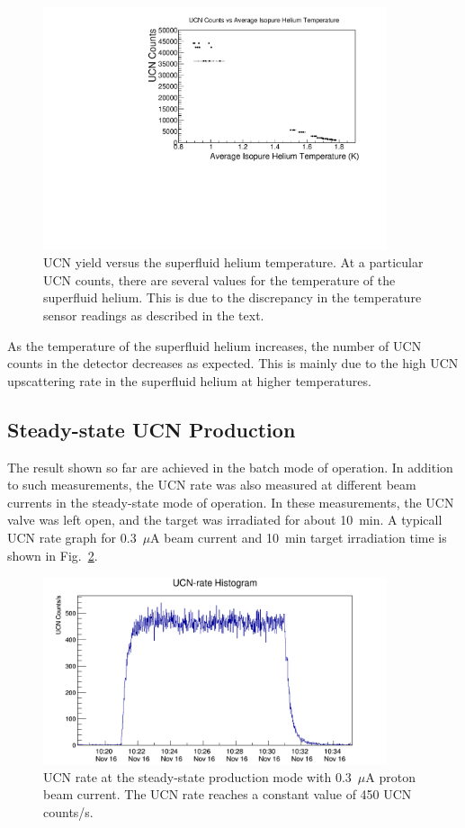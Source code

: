 \begin{figure}[h!]
  \centering
  \includegraphics[width=0.9\textwidth]{counts_vs_temp.pdf}
  \caption{UCN yield versus the superfluid helium temperature. At a
    particular UCN counts, there are several values for the
    temperature of the superfluid helium. This is due to the
    discrepancy in the temperature sensor readings as described in the
    text.}
  \label{fig:counts_vs_temp}
\end{figure}

As the temperature of the superfluid helium increases, the
number of UCN counts in the detector decreases as expected. This is
mainly due to the high UCN upscattering rate in the superfluid helium
at higher temperatures.


\subsection{Steady-state UCN Production\label{sec:steadystate}}

The result shown so far are achieved in the batch mode of
operation. In addition to such measurements, the UCN rate was also
measured at different beam currents in the steady-state mode of
operation. In these measurements, the UCN valve was left open, and the
target was irradiated for about 10~min. A typicall UCN rate graph for
0.3~$\mu$A beam current and 10~min target irradiation time is shown in
Fig.~\ref{fig:UCNRate_steadystate}.


\begin{figure}[h!]
  \centering
  \includegraphics[width=0.9\textwidth]{steadystate_point3muA.png}
  \caption{UCN rate at the steady-state production mode with 0.3~$\mu$A proton beam
    current. The UCN rate reaches a constant value of 450 UCN counts/s.}
  \label{fig:UCNRate_steadystate}
\end{figure}

